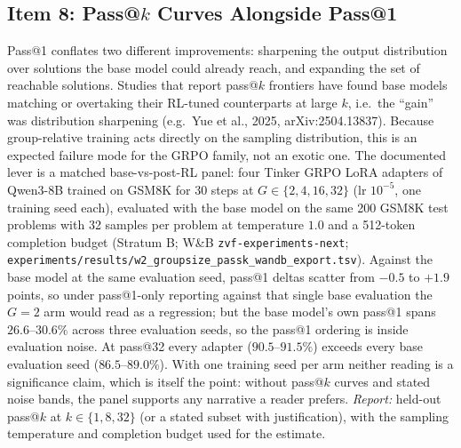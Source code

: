 \subsection{Item 8: Pass@\texorpdfstring{$k$}{k} Curves Alongside Pass@1}
\label{sec:p5-item8}
Pass@1 conflates two different improvements: sharpening the output
distribution over solutions the base model could already reach, and
expanding the set of reachable solutions. Studies that report pass@$k$
frontiers have found base models matching or overtaking their RL-tuned
counterparts at large $k$, i.e.\ the ``gain'' was distribution sharpening
(e.g.\ Yue et al., 2025, arXiv:2504.13837). Because group-relative training
acts directly on the sampling distribution, this is an expected failure mode
for the GRPO family, not an exotic one. The documented lever is a matched
base-vs-post-RL panel: four Tinker GRPO LoRA adapters of Qwen3-8B trained on
GSM8K for 30 steps at $G\in\{2,4,16,32\}$ (lr $10^{-5}$, one training seed
each), evaluated with the base model on the same 200 GSM8K test problems with
32 samples per problem at temperature $1.0$ and a 512-token completion budget
(Stratum B; W\&B \texttt{zvf-experiments-next};
\texttt{experiments/results/w2\_groupsize\_passk\_wandb\_export.tsv}). Against
the base model at the same evaluation seed, pass@1 deltas scatter from $-0.5$
to $+1.9$ points, so under pass@1-only reporting against that single base
evaluation the $G{=}2$ arm would read as a regression; but the base model's own
pass@1 spans $26.6$--$30.6\%$ across three evaluation seeds, so the pass@1
ordering is inside evaluation noise. At pass@32 every adapter
($90.5$--$91.5\%$) exceeds every base evaluation seed ($86.5$--$89.0\%$).
With one training seed per arm neither reading is a significance claim,
which is itself the point: without pass@$k$ curves and stated noise bands,
the panel supports any narrative a reader prefers. \emph{Report:} held-out pass@$k$ at
$k \in \{1, 8, 32\}$ (or a stated subset with justification), with the
sampling temperature and completion budget used for the estimate.

\endinput %
